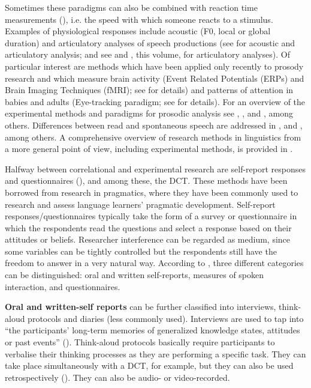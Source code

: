 \documentclass[output=paper]{LSP/langsci}
\begin{document}
Sometimes these paradigms can also be combined with reaction time measurements (\citealt{Chen2003,Feldhausen2011}), i.e. the speed with which someone reacts to a stimulus. Examples of physiological responses include acoustic (F0, local or global duration) and articulatory analyses of speech productions (see \citealt{Prieto1995,Arvaniti1998,Frota2002} for acoustic and articulatory analysis; and see \citealt{DImperio.2007,Muecke2006,Stella2014} and \citeauthor{GiliFivela.2018}, this volume, for articulatory analyses). Of particular interest are methods which have been applied only recently to prosody research and which measure brain activity (Event Related Potentials (ERPs) and Brain Imaging Techniques (fMRI); see \citealt{Kaiser2006} for details) and patterns of attention in babies and adults (Eye-tracking paradigm; see \citealt{Watson2006} for details). For an overview of the experimental methods and paradigms for prosodic analysis see \citet{Sudhoff.2006}, \citet{Prieto.2012}, and \citet{Niebuhr2015}, among others. Differences between read and spontaneous speech are addressed in \citet{Llisterri1992,Beckman1997,Face2003,Xu2010}, and \citet{Wagner.2015}, among others. A comprehensive overview of research methods in linguistics from a more general point of view, including experimental methods, is provided in \citet{Podesva.2013}.

Halfway between correlational and experimental research are self-report responses and questionnaires (), and among these, the DCT. These methods have been borrowed from research in pragmatics, where they have been commonly used to research and assess language learners’ pragmatic development. Self-report responses/questionnaires typically take the form of a survey or questionnaire in which the respondents read the questions and select a response based on their attitudes or beliefs. Researcher interference can be regarded as medium, since some variables can be tightly controlled but the respondents still have the freedom to answer in a very natural way. According to \citet{kasper2002}, three different categories can be distinguished: oral and written self-reports, measures of spoken interaction, and questionnaires. 

\textbf{Oral and written-self reports} can be further classified into interviews, think-aloud protocols and diaries (less commonly used). Interviews are used to tap into ``the participants’ long-term memories of generalized knowledge states, attitudes or past events” (\citealt[107]{kasper2002}). Think-aloud protocols basically require participants to verbalise their thinking processes as they are performing a specific task. They can take place simultaneously with a DCT, for example, but they can also be used retrospectively (\citealt{Cohen1993,Robinson1992}). They can also be audio- or video-recorded.  
\end{document}
